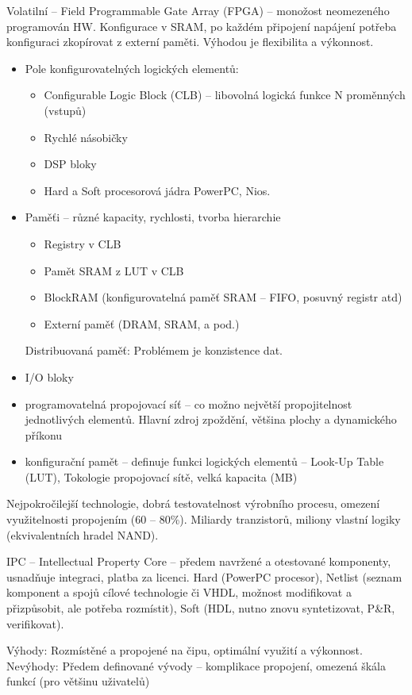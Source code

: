 \documentclass[a4paper, 11pt]{report}
\begin{document}
Volatilní -- Field Programmable Gate Array (FPGA) -- monožost neomezeného programován HW. Konfigurace v SRAM, po každém připojení napájení potřeba konfiguraci zkopírovat z externí paměti. Výhodou je flexibilita a výkonnost.
\begin{itemize}
	\item Pole konfigurovatelných logických elementů:
	\begin{itemize}
		\item Configurable Logic Block (CLB) -- libovolná logická funkce N proměnných (vstupů)
		\item Rychlé násobičky
		\item DSP bloky
		\item Hard a Soft procesorová jádra PowerPC, Nios.
	\end{itemize}
	\item Paměťi -- různé kapacity, rychlosti, tvorba hierarchie
	\begin{itemize}
		\item Registry v CLB
		\item Pamět SRAM z LUT v CLB
		\item BlockRAM (konfigurovatelná paměť SRAM -- FIFO, posuvný registr atd)
		\item Externí paměť (DRAM, SRAM, a pod.)
	\end{itemize}
	Distribuovaná paměť: Problémem je konzistence dat.
	\item I/O bloky
	\item programovatelná propojovací síť -- co možno největší propojitelnost jednotlivých elementů. Hlavní zdroj zpoždění, většina plochy a dynamického příkonu
	\item konfigurační pamět -- definuje funkci logických elementů -- Look-Up Table (LUT), Tokologie propojovací sítě, velká kapacita (MB)
\end{itemize}

Nejpokročilejší technologie, dobrá testovatelnost výrobního procesu, omezení využitelnosti propojením (60 -- 80\%). Miliardy tranzistorů, miliony vlastní logiky (ekvivalentních hradel NAND).

IPC -- Intellectual Property Core -- předem navržené a otestované komponenty, usnadňuje integraci, platba za licenci. Hard (PowerPC procesor), Netlist (seznam komponent a spojů cílové technologie či VHDL, možnost modifikovat a přizpůsobit, ale potřeba rozmístit), Soft (HDL, nutno znovu syntetizovat, P\&R, verifikovat).

Výhody: Rozmístěné a propojené na čipu, optimální využití a výkonnost.\\
Nevýhody: Předem definované vývody -- komplikace propojení, omezená škála funkcí (pro většinu uživatelů)
\end{document}
